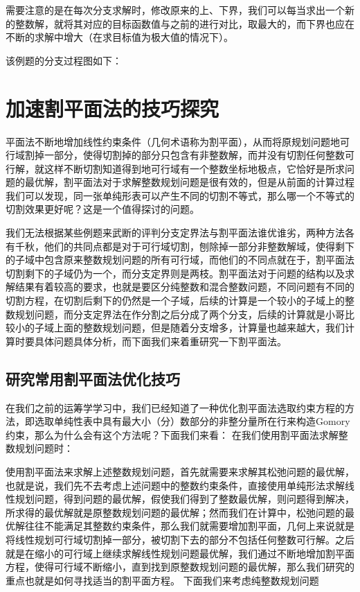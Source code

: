 需要注意的是在每次分支求解时，修改原来的上、下界，我们可以每当求出一个新的整数解，就将其对应的目标函数值与之前的进行对比，取最大的，而下界也应在不断的求解中增大（在求目标值为极大值的情况下）。

该例题的分支过程图如下：

\section{加速割平面法的技巧探究}

平面法不断地增加线性约束条件（几何术语称为割平面），从而将原规划问题地可行域割掉一部分，使得切割掉的部分只包含有非整数解，而并没有切割任何整数可行解，就这样不断切割知道得到地可行域有一个整数坐标地极点，它恰好是所求问题的最优解，割平面法对于求解整数规划问题是很有效的，但是从前面的计算过程我们可以发现，同一张单纯形表可以产生不同的切割不等式，那么哪一个不等式的切割效果更好呢？这是一个值得探讨的问题。

我们无法根据某些例题来武断的评判分支定界法与割平面法谁优谁劣，两种方法各有千秋，他们的共同点都是对于可行域切割，刨除掉一部分非整数解域，使得剩下的子域中包含原来整数规划问题的所有可行域，而他们的不同点就在于，割平面法切割剩下的子域仍为一个，而分支定界则是两枝。割平面法对于问题的结构以及求解结果有着较高的要求，也就是要区分纯整数和混合整数问题，不同问题有不同的切割方程，在切割后剩下的仍然是一个子域，后续的计算是一个较小的子域上的整数规划问题，而分支定界法在作分割之后分成了两个分支，后续的计算就是小哥比较小的子域上面的整数规划问题，但是随着分支增多，计算量也越来越大，我们计算时要具体问题具体分析，而下面我们来着重研究一下割平面法。


\subsection{研究常用割平面法优化技巧}

在我们之前的运筹学学习中，我们已经知道了一种优化割平面法选取约束方程的方法，即选取单纯性表中具有最大小（分）数部分的非整分量所在行来构造Gomory约束，那么为什么会有这个方法呢？下面我们来看：
在我们使用割平面法求解整数规划问题时：


使用割平面法来求解上述整数规划问题，首先就需要来求解其松弛问题的最优解，也就是说，我们先不去考虑上述问题中的整数约束条件，直接使用单纯形法求解线性规划问题，得到问题的最优解，假使我们得到了整数最优解，则问题得到解决，所求得的最优解就是原整数规划问题的最优解；然而我们在计算中，松弛问题的最优解往往不能满足其整数约束条件，那么我们就需要增加割平面，几何上来说就是将线性规划可行域切割掉一部分，被切割下去的部分不包括任何整数可行解。之后就是在缩小的可行域上继续求解线性规划问题最优解，我们通过不断地增加割平面方程，使得可行域不断缩小，直到找到原整数规划问题的最优解，那么我们研究的重点也就是如何寻找适当的割平面方程。
下面我们来考虑纯整数规划问题 


